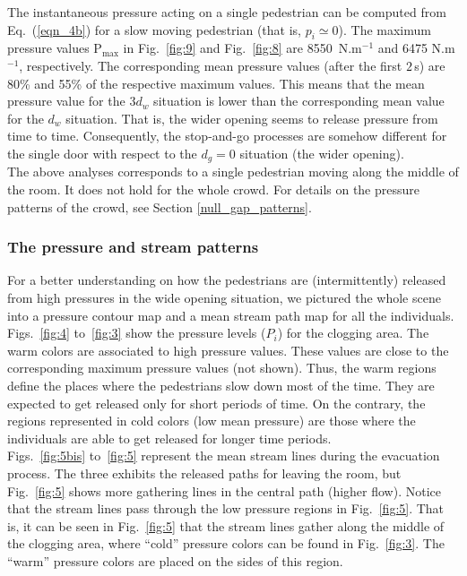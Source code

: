 The instantaneous pressure acting on a single pedestrian can be computed from 
Eq.~(\ref{eqn_4b}) for a slow moving pedestrian (that is, $p_i\simeq 0$). 
The maximum pressure values $\mathrm{P}_\mathrm{max}$ in 
Fig.~\ref{fig:9} and Fig.~\ref{fig:8} are 8550~N.m$^{-1}$ and 6475 N.m$^{-1}$, respectively. 
The corresponding mean pressure values (after the first $2\,$s) are 80\% and 
55\% of the respective maximum values. This means that the mean pressure value for the 
$3d_w$ situation is lower than the corresponding mean value for the $d_w$ situation. 
That is, the wider opening seems to release pressure from time to time. Consequently, 
the stop-and-go processes are somehow different for the 
single door with respect to the $d_g=0$ situation (the wider opening). \\

{\color{red} The above analyses corresponds to a single pedestrian moving along the middle of 
the room. It does not hold for the whole crowd. For details on the pressure patterns of the 
crowd, see Section \ref{null_gap_patterns}. } 

\subsubsection{\label{null_gap_patterns}The pressure and stream patterns}

For a better understanding on how the pedestrians are (intermittently) released 
from high pressures in the wide opening situation, we pictured the whole scene 
into a pressure contour map and a mean stream path map for all the individuals. 
Figs.~\ref{fig:4} to~\ref{fig:3} show the pressure levels ($P_i$) for the 
clogging area. The warm colors are associated to high pressure values. These 
values are close to the corresponding maximum pressure values (not shown). Thus, 
the warm regions define the places where the pedestrians slow down most of the 
time. They are expected to get released only for short periods of time. On the 
contrary, the regions represented in cold colors (low mean pressure) are those 
where the individuals are able to get released for longer time periods. \\

{\color{red} Figs.~\ref{fig:5bis} to~\ref{fig:5} represent the mean stream lines during the evacuation 
process. The three exhibits the 
released paths for leaving the room, but Fig.~\ref{fig:5} shows more gathering lines in the central path (higher flow)}. Notice that the stream lines pass 
through the low pressure regions {\color{red} in Fig.~\ref{fig:5}}. That is, it can be seen in Fig.~\ref{fig:5} 
that the stream lines gather along the middle of the clogging area, 
where ``cold'' pressure colors can be found in Fig.~\ref{fig:3}. The 
``warm'' pressure colors are placed on the sides of this region.    \\ 


